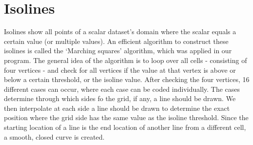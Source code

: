 \section{Isolines}
Isolines show all points of a scalar dataset's domain where the scalar equals a certain value (or multiple values).
An efficient algorithm to construct these isolines is called the `Marching squares' algorithm, which was applied in our program.
The general idea of the algorithm is to loop over all cells - consisting of four vertices - and check for all vertices if the value at that vertex is above or below a certain threshold, or the isoline value.
After checking the four vertices, 16 different cases can occur, where each case can be coded individually.
The cases determine through which sides fo the grid, if any, a line should be drawn. We then interpolate at each side a line should be drawn to determine the exact position where the grid side has the same value as the isoline threshold.
Since the starting location of a line is the end location of another line from a different cell, a smooth, closed curve is created.